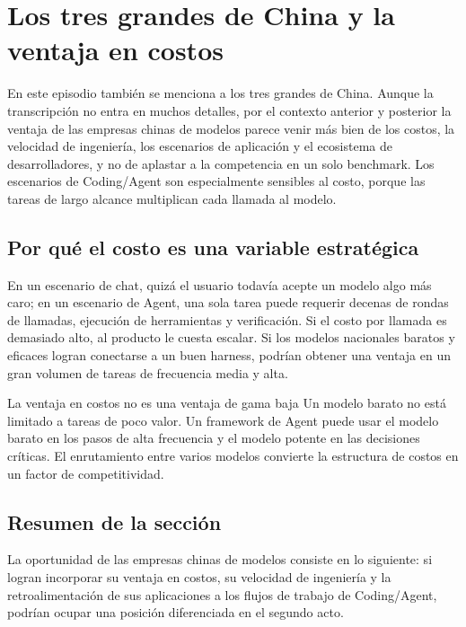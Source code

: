 \section{Los tres grandes de China y la ventaja en costos}

En este episodio también se menciona a los tres grandes de China. Aunque la transcripción no entra en muchos detalles, por el contexto anterior y posterior la ventaja de las empresas chinas de modelos parece venir más bien de los costos, la velocidad de ingeniería, los escenarios de aplicación y el ecosistema de desarrolladores, y no de aplastar a la competencia en un solo benchmark. Los escenarios de Coding/Agent son especialmente sensibles al costo, porque las tareas de largo alcance multiplican cada llamada al modelo.

\subsection{Por qué el costo es una variable estratégica}

En un escenario de chat, quizá el usuario todavía acepte un modelo algo más caro; en un escenario de Agent, una sola tarea puede requerir decenas de rondas de llamadas, ejecución de herramientas y verificación. Si el costo por llamada es demasiado alto, al producto le cuesta escalar. Si los modelos nacionales baratos y eficaces logran conectarse a un buen harness, podrían obtener una ventaja en un gran volumen de tareas de frecuencia media y alta.

\begin{importantbox}{La ventaja en costos no es una ventaja de gama baja}
Un modelo barato no está limitado a tareas de poco valor. Un framework de Agent puede usar el modelo barato en los pasos de alta frecuencia y el modelo potente en las decisiones críticas. El enrutamiento entre varios modelos convierte la estructura de costos en un factor de competitividad.
\end{importantbox}

\subsection{Resumen de la sección}

La oportunidad de las empresas chinas de modelos consiste en lo siguiente: si logran incorporar su ventaja en costos, su velocidad de ingeniería y la retroalimentación de sus aplicaciones a los flujos de trabajo de Coding/Agent, podrían ocupar una posición diferenciada en el segundo acto.
